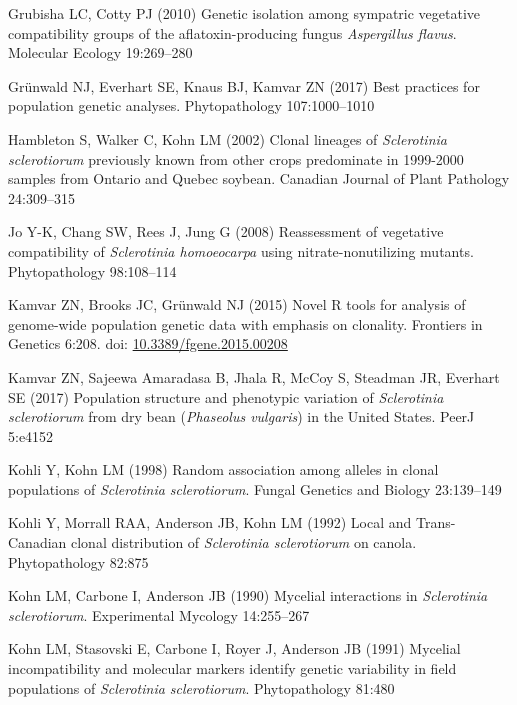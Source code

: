 \hypertarget{ref-Grubisha2010-ld}{}
Grubisha LC, Cotty PJ (2010) Genetic isolation among sympatric
vegetative compatibility groups of the aflatoxin-producing fungus
\emph{Aspergillus flavus}. Molecular Ecology 19:269--280

\hypertarget{ref-Grunwald2017-wd}{}
Grünwald NJ, Everhart SE, Knaus BJ, Kamvar ZN (2017) Best practices for
population genetic analyses. Phytopathology 107:1000--1010

\hypertarget{ref-Hambleton2002-an}{}
Hambleton S, Walker C, Kohn LM (2002) Clonal lineages of
\emph{Sclerotinia sclerotiorum} previously known from other crops
predominate in 1999-2000 samples from Ontario and Quebec soybean.
Canadian Journal of Plant Pathology 24:309--315

\hypertarget{ref-Jo2008-ft}{}
Jo Y-K, Chang SW, Rees J, Jung G (2008) Reassessment of vegetative
compatibility of \emph{Sclerotinia homoeocarpa} using
nitrate-nonutilizing mutants. Phytopathology 98:108--114

\hypertarget{ref-Kamvar2015-ff}{}
Kamvar ZN, Brooks JC, Grünwald NJ (2015) Novel R tools for analysis of
genome-wide population genetic data with emphasis on clonality.
Frontiers in Genetics 6:208. doi:
\href{https://doi.org/10.3389/fgene.2015.00208}{10.3389/fgene.2015.00208}

\hypertarget{ref-Kamvar2017-cl}{}
Kamvar ZN, Sajeewa Amaradasa B, Jhala R, McCoy S, Steadman JR, Everhart
SE (2017) Population structure and phenotypic variation of
\emph{Sclerotinia sclerotiorum} from dry bean (\emph{Phaseolus
vulgaris}) in the United States. PeerJ 5:e4152

\hypertarget{ref-Kohli1998-hh}{}
Kohli Y, Kohn LM (1998) Random association among alleles in clonal
populations of \emph{Sclerotinia sclerotiorum}. Fungal Genetics and
Biology 23:139--149

\hypertarget{ref-Kohli1992-pe}{}
Kohli Y, Morrall RAA, Anderson JB, Kohn LM (1992) Local and
Trans-Canadian clonal distribution of \emph{Sclerotinia sclerotiorum} on
canola. Phytopathology 82:875

\hypertarget{ref-Kohn1990-po}{}
Kohn LM, Carbone I, Anderson JB (1990) Mycelial interactions in
\emph{Sclerotinia sclerotiorum}. Experimental Mycology 14:255--267

\hypertarget{ref-Kohn1991-wq}{}
Kohn LM, Stasovski E, Carbone I, Royer J, Anderson JB (1991) Mycelial
incompatibility and molecular markers identify genetic variability in
field populations of \emph{Sclerotinia sclerotiorum}. Phytopathology 81:480


